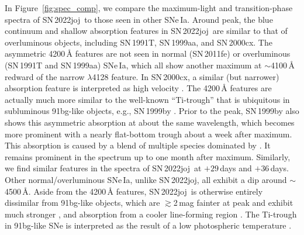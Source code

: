 \documentclass[twocolumn]{aastex631}
\newcommand{\sn}{SN\,2022joj}
\begin{document}
\begin{CJK*}{UTF8}{gbsn}
In Figure~\ref{fig:spec_comp}, we compare the maximum-light and transition-phase spectra of \sn\ to those seen in other SNe\,Ia. Around peak, the blue continuum and shallow absorption features in \sn\ are similar to that of overluminous objects, including SN\,1991T, SN\,1999aa, and SN\,2000cx. The asymmetric 4200\,\r{A} features are not seen in normal (SN\,2011fe) or overluminous (SN\,1991T and SN\,1999aa) SNe\,Ia, which all show another maximum at $\sim$4100\,\r{A} redward of the narrow  $\lambda$4128 feature. In SN\,2000cx, a similar (but narrower) absorption feature is interpreted as high velocity  \citep{Branch_00cx_2004}. The 4200\,\r{A} features are actually much more similar to the well-known ``Ti-trough'' that is ubiquitous in subluminous 91bg-like objects, e.g., SN\,1999by \citep{Arbour_1999}. Prior to the peak, SN\,1999by also shows this asymmetric absorption at about the same wavelength, which becomes more prominent with a nearly flat-bottom trough about a week after maximum. This absorption is caused by a blend of multiple species dominated by  \citep{Filippenko_91bg_1992,Mazzali_1997}. It remains prominent in the spectrum up to one month after maximum. Similarly, we find similar features in the spectra of \sn\ at $+29$\,days and $+36$\,days. Other normal/overluminous SNe\,Ia, unlike \sn, all exhibit a dip around $\sim$4500\,\r{A}. Aside from the 4200\,\r{A} features, \sn\ is otherwise entirely dissimilar from 91bg-like objects, which are $\gtrsim$2\,mag fainter at peak and exhibit much stronger ,  and  absorption from a cooler line-forming region \citep{Filippenko_91bg_1992}. The Ti-trough in 91bg-like SNe is interpreted as the result of a low photospheric temperature \citep{Mazzali_1997}.


\end{CJK*}
\end{document}
